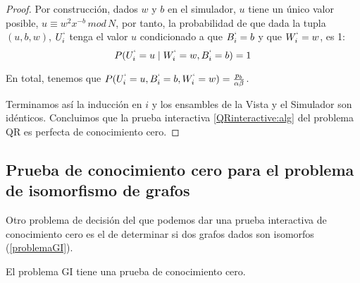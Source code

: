 \begin{proof}
	Por construcción, dados $w$ y $b$ en el simulador, $u$ tiene un único valor posible, $u\equiv w^2x^{-b}\,mod\,N$, por tanto, la probabilidad de que dada la tupla $(u, b, w)$, $U_i^`$ tenga el valor $u$ condicionado a que $ B_i^`=b$ y que $W_i^`=w$, es 1:
	\[P(U_i^`=u \mid W_i^`=w, B_i^`=b) = 1\]
	
	En total, tenemos que $P(U_i^`=u, B_i^`=b, W_i^`=w) = \frac{p_b}{\alpha \beta}$.
	
	
	Terminamos así la inducción en $i$ y los ensambles de la Vista y el Simulador son idénticos. Concluimos que la prueba interactiva \ref{QRinteractive:alg} del problema QR es perfecta de conocimiento cero.
	
\end{proof}



\subsection{Prueba de conocimiento cero para el problema de isomorfismo de grafos}


Otro problema de decisión del que podemos dar una prueba interactiva de conocimiento cero es el de determinar si dos grafos dados son isomorfos (\autoref{problemaGI}).


\begin{theorem}
	El problema GI tiene una prueba de conocimiento cero.
\end{theorem}


